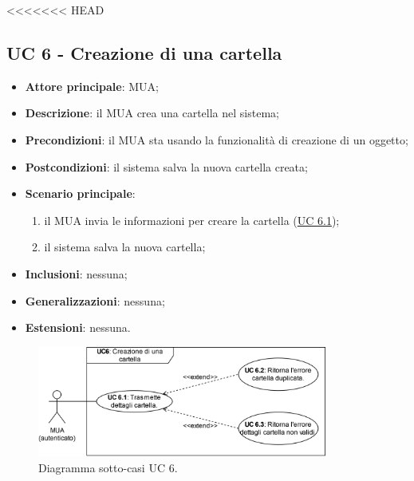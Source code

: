 <<<<<<< HEAD
\subsection{UC 6 - Creazione di una cartella} \label{sec:UC6}
    \begin{itemize}
        \item \textbf{Attore principale}: MUA;
        \item \textbf{Descrizione}: il MUA crea una cartella nel sistema;
        \item \textbf{Precondizioni}: il MUA sta usando la funzionalità di creazione di un oggetto;
        \item \textbf{Postcondizioni}: il sistema salva la nuova cartella creata;
        \item \textbf{Scenario principale}:
            \begin{enumerate}
                \item il MUA invia le informazioni per creare la cartella (\hyperref[sec:UC6.1]{UC 6.1});
                \item il sistema salva la nuova cartella;
            \end{enumerate}
        \item \textbf{Inclusioni}: nessuna;
        \item \textbf{Generalizzazioni}: nessuna;
        \item \textbf{Estensioni}: nessuna.
    \end{itemize}

\begin{figure}[h]
    \includegraphics[width=0.85\textwidth]{sections/uc_imgs/UC06.X.png}
    \centering
    \caption{Diagramma sotto-casi UC 6.}
\end{figure}

